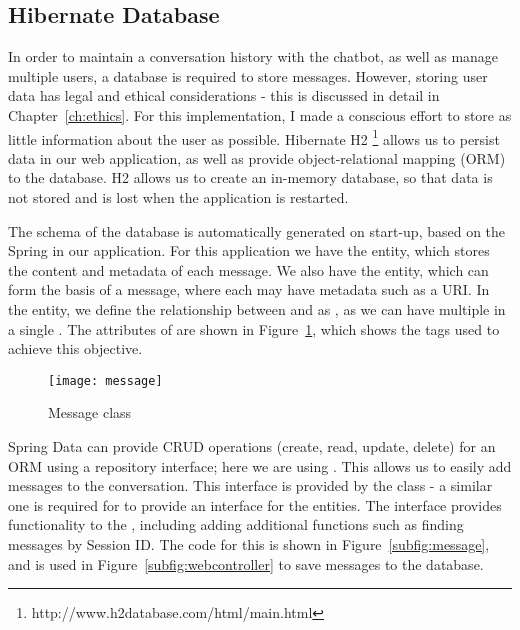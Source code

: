 \newpage
\subsection{Hibernate Database}
In order to maintain a conversation history with the chatbot, as well as manage multiple users, a database is required to store messages. However, storing user data has legal and ethical considerations - this is discussed in detail in Chapter~\ref{ch:ethics}. For this implementation, I made a conscious effort to store as little information about the user as possible. Hibernate H2 \footnote{http://www.h2database.com/html/main.html} allows us to persist data in our web application, as well as provide object-relational mapping (ORM) to the database. H2 allows us to create an in-memory database, so that data is not stored and is lost when the application is restarted.

The schema of the database is automatically generated on start-up, based on the Spring  in our application. For this application we have the  entity, which stores the content and metadata of each message. We also have the  entity, which can form the basis of a  message, where each  may have metadata such as a URI. In the  entity, we define the relationship between  and  as , as we can have multiple  in a single . The attributes of  are shown in Figure~\ref{fig:message}, which shows the tags used to achieve this objective.

\begin{figure}[h]
	\centering
	\texttt{[image: message]}
	\caption{Message class}
	\label{fig:message}
\end{figure}


Spring Data can provide CRUD operations (create, read, update, delete) for an ORM using a repository interface; here we are using . This allows us to easily add messages to the conversation. This interface is provided by the  class - a similar one is required for  to provide an interface for the  entities. The  interface provides functionality to the , including adding additional functions such as finding messages by Session ID. The code for this is shown in Figure~\ref{subfig:message}, and is used in Figure~\ref{subfig:webcontroller} to save messages to the database.

